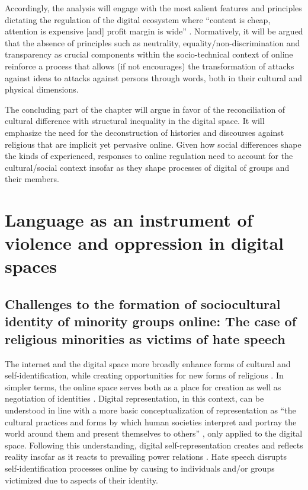 \documentclass[output=paper,colorlinks,citecolor=brown]{langscibook}
\begin{document}
Accordingly, the analysis will engage with the most salient features and principles dictating the regulation of the digital ecosystem where ``content is cheap, attention is expensive [and] profit margin is wide'' \citep{grambo2019}. Normatively, it will be argued that the absence of principles such as neutrality, equality/non-discrimination and transparency as crucial components within the socio-technical context of online  reinforce a process that allows (if not encourages) the transformation of attacks against ideas to attacks against persons through words, both in their cultural and physical dimensions.

The concluding part of the chapter will argue in favor of the reconciliation of cultural difference with structural inequality in the digital space. It will emphasize the need for the deconstruction of histories and discourses against religious  that are implicit yet pervasive online. Given how social differences shape the kinds of  experienced, responses to online  regulation need to account for the cultural/social context insofar as they shape processes of digital  of  groups and their members.

\section{Language as an instrument of violence and oppression in digital spaces}\label{ch.1.2.ss.2}

\subsection{Challenges to the formation of sociocultural identity of minority groups online: The case of religious minorities as victims of hate speech}\label{ch.1.2.ss.2.1}

The internet and the digital space more broadly enhance forms of cultural  and self-identification, while creating opportunities for new forms of religious  \citep{campbell2010}. In simpler terms, the online space serves both as a place for creation as well as negotiation of identities \citep[125]{cocq2013}. Digital representation, in this context, can be understood in line with a more basic conceptualization of representation as ``the cultural practices and forms by which human societies interpret and portray the world around them and present themselves to others'' \citep[12]{cloke_crang_goodwin2005}, only applied to the digital space. Following this understanding, digital self-representation creates and reflects reality insofar as it reacts to prevailing power relations \citep[327]{helander2014}. Hate speech disrupts self-identification processes online by causing  to individuals and/or groups victimized due to aspects of their identity.
\end{document}
